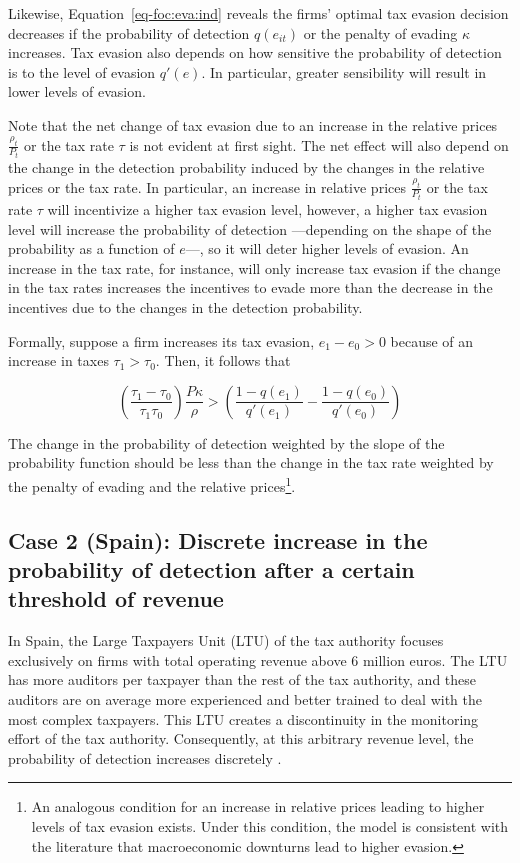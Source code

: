 \documentclass[
  12pt]{article}
\theoremstyle{definition}
\theoremstyle{remark}
\begin{document}
Likewise, Equation~\ref{eq-foc:eva:ind} reveals the firms' optimal tax
evasion decision decreases if the probability of detection \(q(e_{it})\)
or the penalty of evading \(\kappa\) increases. Tax evasion also depends
on how sensitive the probability of detection is to the level of evasion
\(q'(e)\). In particular, greater sensibility will result in lower
levels of evasion.

Note that the net change of tax evasion due to an increase in the
relative prices \(\frac{\rho_{t}}{P_t}\) or the tax rate \(\tau\) is not
evident at first sight. The net effect will also depend on the change in
the detection probability induced by the changes in the relative prices
or the tax rate. In particular, an increase in relative prices
\(\frac{\rho_{t}}{P_t}\) or the tax rate \(\tau\) will incentivize a
higher tax evasion level, however, a higher tax evasion level will
increase the probability of detection ---depending on the shape of the
probability as a function of \(e\)---, so it will deter higher levels of
evasion. An increase in the tax rate, for instance, will only increase
tax evasion if the change in the tax rates increases the incentives to
evade more than the decrease in the incentives due to the changes in the
detection probability.

Formally, suppose a firm increases its tax evasion, \(e_1-e_0>0\)
because of an increase in taxes \(\tau_1>\tau_0\). Then, it follows that

\[
\left(\frac{\tau_1-\tau_0}{\tau_1\tau_0}\right)\frac{P\kappa}{\rho}>
  \left(\frac{1-q(e_1)}{q'(e_1)}-\frac{1-q(e_0)}{q'(e_0)}\right)
\]

The change in the probability of detection weighted by the slope of the
probability function should be less than the change in the tax rate
weighted by the penalty of evading and the relative prices\footnote{An
  analogous condition for an increase in relative prices leading to
  higher levels of tax evasion exists. Under this condition, the model
  is consistent with the literature that macroeconomic downturns lead to
  higher evasion.}.

\subsection{Case 2 (Spain): Discrete increase in the probability of
detection after a certain threshold of
revenue}\label{case-2-spain-discrete-increase-in-the-probability-of-detection-after-a-certain-threshold-of-revenue}

In Spain, the Large Taxpayers Unit (LTU) of the tax authority focuses
exclusively on firms with total operating revenue above 6 million euros.
The LTU has more auditors per taxpayer than the rest of the tax
authority, and these auditors are on average more experienced and better
trained to deal with the most complex taxpayers. This LTU creates a
discontinuity in the monitoring effort of the tax authority.
Consequently, at this arbitrary revenue level, the probability of
detection increases discretely \citep{Almunia2018}.
\end{document}
